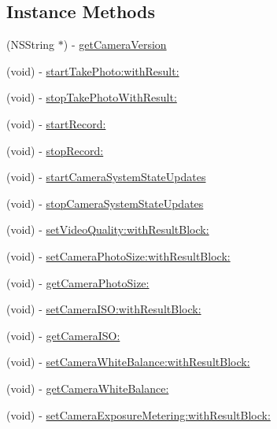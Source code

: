 \subsection*{Instance Methods}
\begin{DoxyCompactItemize}
\item 
(N\+S\+String $\ast$) -\/ \hyperlink{interface_d_j_i_camera_a7c2320f498ee70afef23423f8f0d1d31}{get\+Camera\+Version}
\item 
(void) -\/ \hyperlink{interface_d_j_i_camera_a090650e2871815020f6173d896aa78be}{start\+Take\+Photo\+:with\+Result\+:}
\item 
(void) -\/ \hyperlink{interface_d_j_i_camera_a0ece0c556f5c761bb719b60b29035779}{stop\+Take\+Photo\+With\+Result\+:}
\item 
(void) -\/ \hyperlink{interface_d_j_i_camera_a4619149cc2aedaf0553925ddd3c9ffa5}{start\+Record\+:}
\item 
(void) -\/ \hyperlink{interface_d_j_i_camera_ab5b94d6306cfb45412f1bd437a5309ce}{stop\+Record\+:}
\item 
(void) -\/ \hyperlink{interface_d_j_i_camera_a53ae8c880028f6f386a91b7b7ad32e1c}{start\+Camera\+System\+State\+Updates}
\item 
(void) -\/ \hyperlink{interface_d_j_i_camera_a866b64532676176a7a1b8eb890b188d8}{stop\+Camera\+System\+State\+Updates}
\item 
(void) -\/ \hyperlink{interface_d_j_i_camera_a056998f58df4c307417929683cd56066}{set\+Video\+Quality\+:with\+Result\+Block\+:}
\item 
(void) -\/ \hyperlink{interface_d_j_i_camera_a0b0183eed1dbf991ce49942f32e78a4b}{set\+Camera\+Photo\+Size\+:with\+Result\+Block\+:}
\item 
(void) -\/ \hyperlink{interface_d_j_i_camera_a3bb87caf5b5f9d3810cb4bad9cc15075}{get\+Camera\+Photo\+Size\+:}
\item 
(void) -\/ \hyperlink{interface_d_j_i_camera_a50e4e75ec9ed1bdac6a058fc36820f77}{set\+Camera\+I\+S\+O\+:with\+Result\+Block\+:}
\item 
(void) -\/ \hyperlink{interface_d_j_i_camera_a9b98d7b6e1f51e1087fed5e514bb9a3d}{get\+Camera\+I\+S\+O\+:}
\item 
(void) -\/ \hyperlink{interface_d_j_i_camera_a196c669179c9c9cf02ef2b554f56081d}{set\+Camera\+White\+Balance\+:with\+Result\+Block\+:}
\item 
(void) -\/ \hyperlink{interface_d_j_i_camera_a1b0a2c1fdbb4b01e1881b48f11355d86}{get\+Camera\+White\+Balance\+:}
\item 
(void) -\/ \hyperlink{interface_d_j_i_camera_ada2dace1e4513d0fa39e99e9e80d32fc}{set\+Camera\+Exposure\+Metering\+:with\+Result\+Block\+:}

\end{DoxyCompactItemize}
